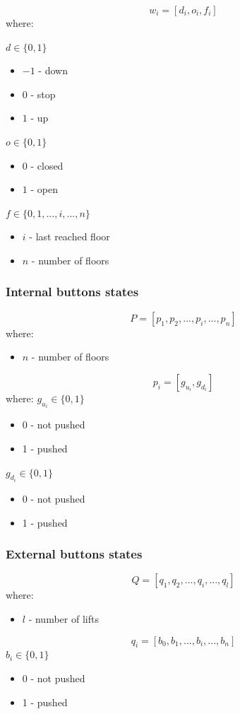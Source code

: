 \documentclass{article}
\begin{document}
\[ w_i = [d_i, o_i, f_i] \]
where:

\(d \in \{0,1\}\)
\begin{itemize}
  \item \(-1\) - down
  \item \(0\) - stop
  \item \(1\) - up
\end{itemize}

\(o \in \{0,1\}\)
\begin{itemize}
  \item \(0\) - closed
  \item \(1\) - open
\end{itemize}

\(f \in \{0,1,...,i,...,n\}\)
\begin{itemize}
  \item \(i\) - last reached floor
  \item \(n\) - number of floors
\end{itemize}

\subsubsection{Internal buttons states}

\[ P = [p_1, p_2, ..., p_i, ..., p_n] \]
where:
\begin{itemize}
  \item \(n\) - number of floors
\end{itemize}

\[ p_i = [g_{u_i}, g_{d_i}] \]
where:
\(g_{u_i} \in \{0,1\}\)
\begin{itemize}
  \item 0 - not pushed
  \item 1 - pushed
\end{itemize}
\(g_{d_i} \in \{0,1\}\)
\begin{itemize}
  \item 0 - not pushed
  \item 1 - pushed
\end{itemize}


\subsubsection{External buttons states}
\[ Q = [q_1, q_2, ..., q_i, ..., q_l] \]
where:
\begin{itemize}
  \item \(l\) - number of lifts
\end{itemize}
\[q_i = [b_0, b_1, ..., b_i, ..., b_n] \]
\(b_i \in \{0,1\} \)
\begin{itemize}
  \item 0 - not pushed
  \item 1 - pushed
\end{itemize}
\end{document}
